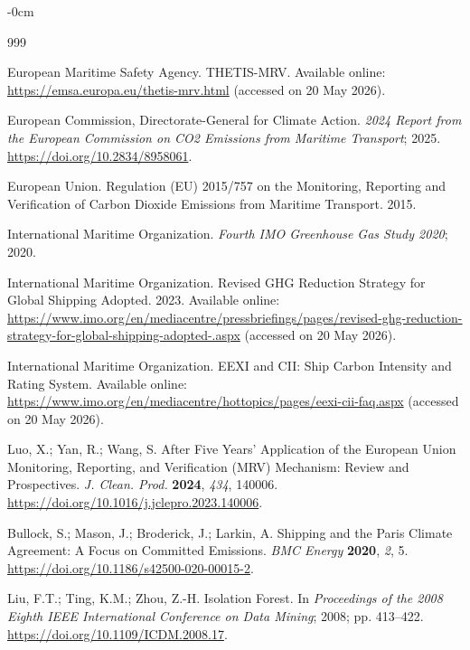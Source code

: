 \documentclass[jmse,article,submit,pdftex,oneauthor]{Definitions/mdpi}
\begin{document}
\begin{adjustwidth}{-\extralength}{0cm}

\begin{thebibliography}{999}

European Maritime Safety Agency. THETIS-MRV. Available online: \url{https://emsa.europa.eu/thetis-mrv.html} (accessed on 20 May 2026).

European Commission, Directorate-General for Climate Action. \textit{2024 Report from the European Commission on CO2 Emissions from Maritime Transport}; 2025. \url{https://doi.org/10.2834/8958061}.

European Union. Regulation (EU) 2015/757 on the Monitoring, Reporting and Verification of Carbon Dioxide Emissions from Maritime Transport. 2015.

International Maritime Organization. \textit{Fourth IMO Greenhouse Gas Study 2020}; 2020.

International Maritime Organization. Revised GHG Reduction Strategy for Global Shipping Adopted. 2023. Available online: \url{https://www.imo.org/en/mediacentre/pressbriefings/pages/revised-ghg-reduction-strategy-for-global-shipping-adopted-.aspx} (accessed on 20 May 2026).

International Maritime Organization. EEXI and CII: Ship Carbon Intensity and Rating System. Available online: \url{https://www.imo.org/en/mediacentre/hottopics/pages/eexi-cii-faq.aspx} (accessed on 20 May 2026).

Luo, X.; Yan, R.; Wang, S. After Five Years' Application of the European Union Monitoring, Reporting, and Verification (MRV) Mechanism: Review and Prospectives. \textit{J. Clean. Prod.} \textbf{2024}, \textit{434}, 140006. \url{https://doi.org/10.1016/j.jclepro.2023.140006}.

Bullock, S.; Mason, J.; Broderick, J.; Larkin, A. Shipping and the Paris Climate Agreement: A Focus on Committed Emissions. \textit{BMC Energy} \textbf{2020}, \textit{2}, 5. \url{https://doi.org/10.1186/s42500-020-00015-2}.

Liu, F.T.; Ting, K.M.; Zhou, Z.-H. Isolation Forest. In \textit{Proceedings of the 2008 Eighth IEEE International Conference on Data Mining}; 2008; pp. 413--422. \url{https://doi.org/10.1109/ICDM.2008.17}.


\end{thebibliography}
\end{adjustwidth}
\end{document}

